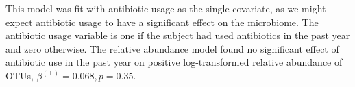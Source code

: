 \documentclass[12pt]{article}
\begin{document}

This model was fit with antibiotic usage as the single covariate, as we might expect antibiotic usage to have a significant effect on the microbiome. The antibiotic usage variable is one if the subject had used antibiotics in the past year and zero otherwise. The relative abundance model found no significant effect of antibiotic use in the past year on positive log-transformed relative abundance of OTUs, $\beta^{(+)} = 0.068, p = 0.35$.


%
\end{document}
